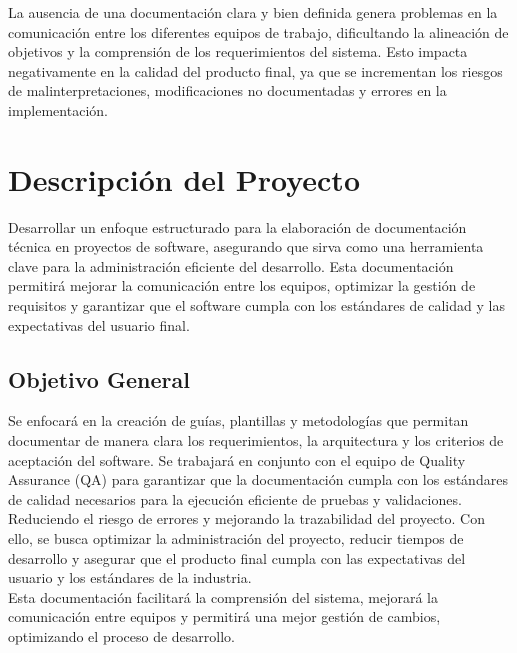 \documentclass[12pt,letterpaper,spanish, xcolor=table]{report}
\numberwithin{figure}{subsection}
\begin{document}
	La ausencia de una documentación clara y bien definida genera problemas en la comunicación entre los diferentes equipos de trabajo, dificultando la alineación de objetivos y la comprensión de los requerimientos del sistema. Esto impacta negativamente en la calidad del producto final, ya que se incrementan los riesgos de malinterpretaciones, modificaciones no documentadas y errores en la implementación.
	

\section{Descripción del Proyecto}
	
	Desarrollar un enfoque estructurado para la elaboración de documentación técnica en proyectos de software, asegurando que sirva como una herramienta clave para la administración eficiente del desarrollo. Esta documentación permitirá mejorar la comunicación entre los equipos, optimizar la gestión de requisitos y garantizar que el software cumpla con los estándares de calidad y las expectativas del usuario final.


\subsection{Objetivo General}

	Se enfocará en la creación de guías, plantillas y metodologías que permitan documentar de manera clara los requerimientos, la arquitectura y los criterios de aceptación del software. Se trabajará en conjunto con el equipo de Quality Assurance (QA) para garantizar que la documentación cumpla con los estándares de calidad necesarios para la ejecución eficiente de pruebas y validaciones.\\
	
	Reduciendo el riesgo de errores y mejorando la trazabilidad del proyecto. Con ello, se busca optimizar la administración del proyecto, reducir tiempos de desarrollo y asegurar que el producto final cumpla con las expectativas del usuario y los estándares de la industria.\\
	
	Esta documentación facilitará la comprensión del sistema, mejorará la comunicación entre equipos y permitirá una mejor gestión de cambios, optimizando el proceso de desarrollo.
	
\end{document}
